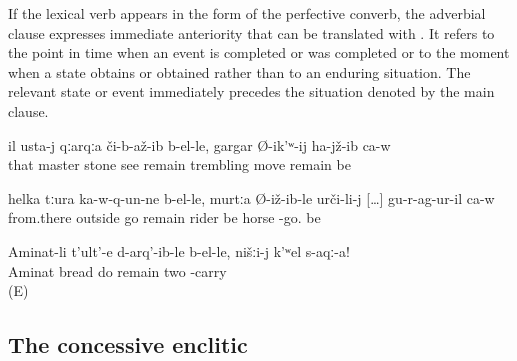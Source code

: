 If the lexical verb appears in the form of the perfective converb, the adverbial clause expresses immediate anteriority that can be translated with . It refers to the point in time when an event is completed or was completed or to the moment when a state obtains or obtained rather than to an enduring situation. The relevant state or event immediately precedes the situation denoted by the main clause.
%
\begin{exe}
	\ex	\label{ex:When / as soon as the master saw the stone, he trembled (started to tremble)}
	\gll	il	usta-j	qːarqːa	či-b-až-ib	b-el-le,	gargar	Ø-ik'ʷ-ij	ha-jž-ib	ca-w\\
		that	master	stone	see	remain	trembling	move	remain be\\
	\glt	{}

	\ex	\label{ex:When / as soon as he went out from there, he mounted the horse}
	\gll	helka	tːura	ka-w-q-un-ne	b-el-le,	murtːa	Ø-iž-ib-le	urči-li-j [\ldots]	gu-r-ag-ur-il	ca-w\\
		from.there	outside	go	remain	rider	be	horse	{}	-go.	be\\
	\glt	{}

	\ex	\label{ex:‎As soon as Aminat makes bread / finishes making bread}
	\gll	Aminat-li	t'ult'-e	d-arq'-ib-le	b-el-le,	nišːi-j	k'ʷel	s-aqː-a!\\
		Aminat	bread	do	remain		two	-carry\\
	\glt	{} (E)
\end{exe}



\subsection{The concessive enclitic  }
\label{sec:concessive enclitic =xar}

